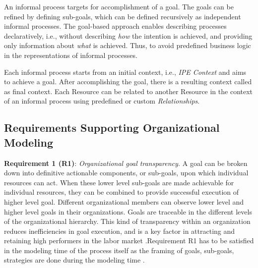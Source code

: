 \hspace{4ex} An informal process targets for accomplishment of a goal. The goals can be refined by defining sub-goals, which can be defined recursively as independent informal processes. The goal-based approach enables describing processes declaratively, i.e., without describing \textit{how} the intention is achieved, and providing only information about \textit{what} is achieved. Thus, to avoid predefined business logic in the representations of informal processes. 

\hspace{4ex} Each informal process starts from an initial context, i.e., \textit{IPE Context} and aims to achieve a goal. After accomplishing the goal, there is a resulting context called as final context. Each Resource can be related to another Resource in the context of an informal process using predefined or custom \textit{Relationships}.

\subsection{Requirements Supporting Organizational Modeling}

\hspace{4ex} \textbf{Requirement 1 (R1)}: \textit{Organizational goal transparency.} A goal can be broken down into definitive actionable components, or sub-goals, upon which individual resources can act. When these lower level sub-goals are made  achievable for individual resources, they can be combined to provide successful execution of higher level goal. Different organizational members can observe lower level and higher level goals in their organizations. Goals are traceable in the different levels of the organizational hierarchy. This kind of transparency within an organization reduces inefficiencies in goal execution, and is a key factor in attracting and retaining high  performers in the labor market \cite{McManus2007}.Requirement R1 has to be satisfied in the modeling time of the process itself as the framing of goals, sub-goals, strategies are done during the modeling time .

